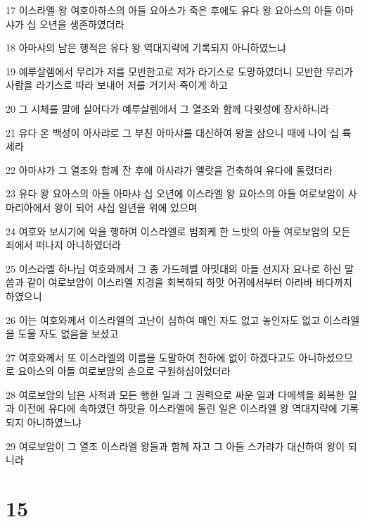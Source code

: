 \par 17 이스라엘 왕 여호아하스의 아들 요아스가 죽은 후에도 유다 왕 요아스의 아들 아마샤가 십 오년을 생존하였더라
\par 18 아마샤의 남은 행적은 유다 왕 역대지략에 기록되지 아니하였느냐
\par 19 예루살렘에서 무리가 저를 모반한고로 저가 라기스로 도망하였더니 모반한 무리가 사람을 라기스로 따라 보내어 저를 거기서 죽이게 하고
\par 20 그 시체를 말에 실어다가 예루살렘에서 그 열조와 함께 다윗성에 장사하니라
\par 21 유다 온 백성이 아사랴로 그 부친 아마샤를 대신하여 왕을 삼으니 때에 나이 십 륙세라
\par 22 아마샤가 그 열조와 함께 잔 후에 아사랴가 엘랏을 건축하여 유다에 돌렸더라
\par 23 유다 왕 요아스의 아들 아마샤 십 오년에 이스라엘 왕 요아스의 아들 여로보암이 사마리아에서 왕이 되어 사십 일년을 위에 있으며
\par 24 여호와 보시기에 악을 행하여 이스라엘로 범죄케 한 느밧의 아들 여로보암의 모든 죄에서 떠나지 아니하였더라
\par 25 이스라엘 하나님 여호와께서 그 종 가드헤벨 아밋대의 아들 선지자 요나로 하신 말씀과 같이 여로보암이 이스라엘 지경을 회복하되 하맛 어귀에서부터 아라바 바다까지 하였으니
\par 26 이는 여호와께서 이스라엘의 고난이 심하여 매인 자도 없고 놓인자도 없고 이스라엘을 도울 자도 없음을 보셨고
\par 27 여호와께서 또 이스라엘의 이름을 도말하여 천하에 없이 하겠다고도 아니하셨으므로 요아스의 아들 여로보암의 손으로 구원하심이었더라
\par 28 여로보암의 남은 사적과 모든 행한 일과 그 권력으로 싸운 일과 다메섹을 회복한 일과 이전에 유다에 속하였던 하맛을 이스라엘에 돌린 일은 이스라엘 왕 역대지략에 기록되지 아니하였느냐
\par 29 여로보암이 그 열조 이스라엘 왕들과 함께 자고 그 아들 스가랴가 대신하여 왕이 되니라

\chapter{15}

